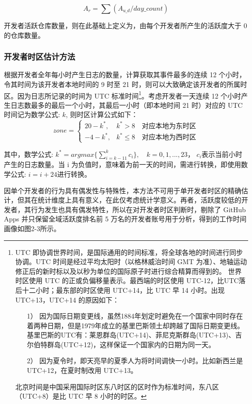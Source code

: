 $$ A_{r} = \sum (A_{u\_d} / day\_count) $$

开发者活跃仓库数量，则在此基础上定义为，由每个开发者所产生的活跃度大于 0 的仓库数量。

\subsubsection{开发者时区估计方法}

\par 根据开发者全年每小时产生日志的数量，计算获取其事件最多的连续 12 个小时，令其时间为该开发者本地时间的 9 时至 21 时，则可以大致确定该开发者的所属时区。因为日志所记录的时间为 UTC 标准时间\footnote{
UTC 即协调世界时间，是国际通用的时间标准，将全球各地的时间进行同步协调。UTC 时间是经过平均太阳时（以格林威治时间 GMT 为准）、地轴运动修正后的新时标以及以秒为单位的国际原子时进行综合精算而得到的。
世界时区使用 UTC 的正或负偏移量表示。最西端的时区使用 UTC-12，比UTC落后十二小时；最东部的时区使用 UTC+14，比 UTC 早 14 小时。出现 UTC+13，UTC+14 的原因如下：
    \begin{enumerate}
        \item[1）] 因为国际日期变更线，虽然1884年划定时避免在一个国家中同时存在着两种日期，但是1979年成立的基里巴斯领土却跨越了国际日期变更线。基里巴斯的UTC有：莱恩群岛(UTC+14)、菲尼克斯群岛(UTC+13)、吉尔伯特群岛(UTC+12)，这样保证一个国家内的日期为同一天。
        \item[2）] 因为夏令时，即天亮早的夏季人为将时间调快一小时。比如新西兰是 UTC+12，在夏时制改用 UTC+13。
    \end{enumerate}
北京时间是中国采用国际时区东八时区的区时作为标准时间，东八区（UTC+8）是比 UTC 早 8 小时的时区。
}。考虑开发者一天连续 12 个小时产生日志数最多的最后一个小时，其最后一小时（即本地时间 21 时）对应的 UTC 时间记为数学公式: $ k $, 则时区计算公式如下：
$$
    zone=
    \begin{cases}
        20-k^*, & k^*>8 \quad \text{对应本地为东时区}     \\
        -4-k^*, & k^*\le 8  \quad \text{对应本地为西时区}
    \end{cases}
$$

\par 其中，数学公式: $ k^*=argmax\{\sum_{i=k-11}^{k}{c_i} \},\quad  k=0,1,...,23 $， $ c_i $表示当前小时产生的日志数量。当 i 为负值时，意味着为前一天的时间，需进行转换，即使用数学公式: $ i=i+24 $进行转换。

\par 因单个开发者的行为具有偶发性与特殊性，本方法不可用于单开发者时区的精确估计，但其在统计维度上具有意义，在此仅考虑统计学意义。再者，活跃度较低的开发者，其行为发生也具有偶发特性，所以在对开发者时区判断时，剔除了 GitHub Apps 并只保留全域活跃度排名前 5 万名的开发者账号用于分析，得到的工作时间画像如图2-3所示。

